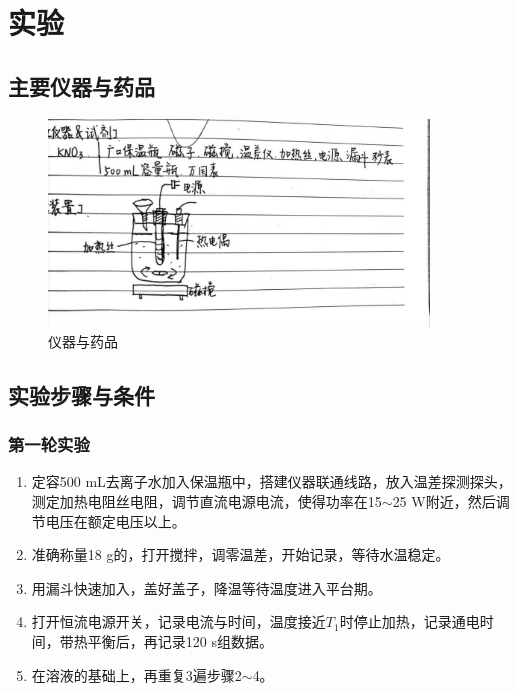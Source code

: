 \documentclass[cn,hazy,pku,12pt,normal,math=newtx,cite=super]{elegantnote}
\begin{document}
\section{实验}

\subsection{主要仪器与药品}

\begin{figure}[htbp]
    \centering
    \includegraphics[width=0.9\textwidth]{figures/0-5.jpg}
    \caption{仪器与药品}
\end{figure}

\subsection{实验步骤与条件}

\subsubsection{第一轮实验}

\begin{enumerate}
    \item 定容500 \si{mL}去离子水加入保温瓶中，搭建仪器联通线路，放入温差探测探头，测定加热电阻丝电阻，调节直流电源电流，使得功率在15$\sim$25 \si{W}附近，然后调节电压在额定电压以上。
    \item 准确称量18 \si{g}的，打开搅拌，调零温差，开始记录，等待水温稳定。
    \item 用漏斗快速加入，盖好盖子，降温等待温度进入平台期。
    \item 打开恒流电源开关，记录电流与时间，温度接近$T_1$时停止加热，记录通电时间，带热平衡后，再记录120 \si{s}组数据。
    \item 在溶液的基础上，再重复3遍步骤2$\sim$4。
\end{enumerate}
\end{document}
